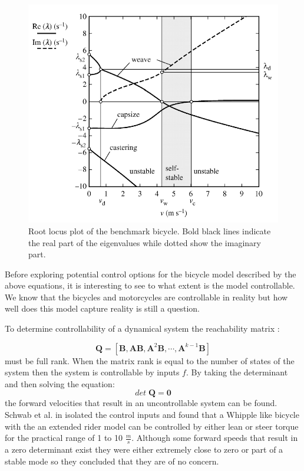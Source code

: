\begin{figure}[ht]
    \centering
    \includegraphics[scale=0.6]{images/figure3_3.png}
    \caption{Root locus plot of the benchmark bicycle. Bold black lines indicate the real part of the eigenvalues while dotted show the imaginary part.\cite{meijaard2007linearized}}
    \label{fig:figure4}
\end{figure}

Before exploring potential control options for the bicycle model described by the above equations, it is interesting to see to what extent is the model controllable. We know that the bicycles and motorcycles are controllable in reality but how well does this model capture reality is still a question.

To determine controllability of a dynamical system the reachability matrix :

\begin{equation}
    \mathbf{Q}=\left[\mathbf{B}, \mathbf{A B}, \mathbf{A}^{2} \mathbf{B}, \cdots, \mathbf{A}^{k-1} \mathbf{B}\right]
    \end{equation}
must be full rank. When the matrix rank is equal to the number of states of the system then the system is controllable by inputs \ensuremath{f}. By taking the determinant and then solving the equation:
\begin{equation}
    det\; \mathbf{Q} = \mathbf{0}
\end{equation} 
the forward velocities that result in an uncontrollable system can be found. Schwab et al. in \cite{schwab2010controllability} isolated the control inputs and found that a Whipple like bicycle with the an extended rider model can be controlled by either lean or steer torque for the practical range of 1 to 10 \ensuremath{\frac{m}{s}}. Although some forward speeds that result in a zero determinant exist they were either extremely close to zero or part of a stable mode so they concluded that they are of no concern.

